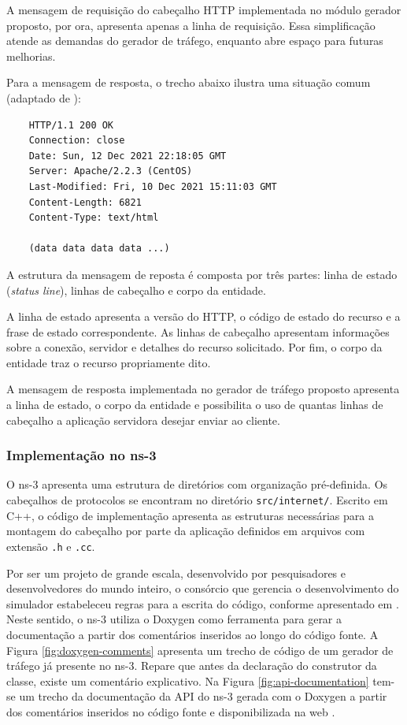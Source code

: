 A mensagem de requisição do cabeçalho HTTP implementada no módulo gerador proposto, por ora, apresenta apenas a linha de requisição. Essa simplificação atende as demandas do gerador de tráfego, enquanto abre espaço para futuras melhorias.

Para a mensagem de resposta, o trecho abaixo ilustra uma situação comum (adaptado de \cite{Kurose2013}):

\begin{verbatim}
	HTTP/1.1 200 OK
	Connection: close
	Date: Sun, 12 Dec 2021 22:18:05 GMT
	Server: Apache/2.2.3 (CentOS)
	Last-Modified: Fri, 10 Dec 2021 15:11:03 GMT
	Content-Length: 6821
	Content-Type: text/html
	
	(data data data data ...)
\end{verbatim}

A estrutura da mensagem de reposta é composta por três partes: linha de estado (\textit{status line}), linhas de cabeçalho e corpo da entidade.

A linha de estado apresenta a versão do HTTP, o código de estado do recurso e a frase de estado correspondente. As linhas de cabeçalho apresentam informações sobre a conexão, servidor e detalhes do recurso solicitado. Por fim, o corpo da entidade traz o recurso propriamente dito.

A mensagem de resposta implementada no gerador de tráfego proposto apresenta a linha de estado, o corpo da entidade e possibilita o uso de quantas linhas de cabeçalho a aplicação servidora desejar enviar ao cliente.

\subsubsection{Implementação no ns-3}
O ns-3 apresenta uma estrutura de diretórios com organização pré-definida. Os cabeçalhos de protocolos se encontram no diretório \verb|src/internet/|. Escrito em C++, o código de implementação apresenta as estruturas necessárias para a montagem do cabeçalho por parte da aplicação definidos em arquivos com extensão \verb|.h| e \verb|.cc|.

Por ser um projeto de grande escala, desenvolvido por pesquisadores e desenvolvedores do mundo inteiro, o consórcio que gerencia o desenvolvimento do simulador estabeleceu regras para a escrita do código, conforme apresentado em \cite{ns-3-contributing}. Neste sentido, o ns-3 utiliza o Doxygen como ferramenta para gerar a documentação a partir dos comentários inseridos ao longo do código fonte. A Figura \ref{fig:doxygen-comments} apresenta um trecho de código de um gerador de tráfego já presente no ns-3. Repare que antes da declaração do construtor da classe, existe um comentário explicativo. Na Figura \ref{fig:api-documentation} tem-se um trecho da documentação da API do ns-3 gerada com o Doxygen a partir dos comentários inseridos no código fonte e disponibilizada na web \cite{ns-3-api}.


